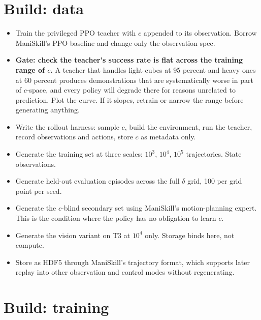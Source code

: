 \documentclass[9pt]{extarticle}
\newcommand{\ck}{\item[$\square$]}
\begin{document}
\section{Build: data}

\begin{itemize}
\ck Train the privileged PPO teacher with $c$ appended to its observation. Borrow ManiSkill's PPO baseline and change only the observation spec.
\ck \textbf{Gate: check the teacher's success rate is flat across the training range of $c$.} A teacher that handles light cubes at 95 percent and heavy ones at 60 percent produces demonstrations that are systematically worse in part of $c$-space, and every policy will degrade there for reasons unrelated to prediction. Plot the curve. If it slopes, retrain or narrow the range before generating anything.
\ck Write the rollout harness: sample $c$, build the environment, run the teacher, record observations and actions, store $c$ as metadata only.
\ck Generate the training set at three scales: $10^3$, $10^4$, $10^5$ trajectories. State observations.
\ck Generate held-out evaluation episodes across the full $\delta$ grid, 100 per grid point per seed.
\ck Generate the $c$-blind secondary set using ManiSkill's motion-planning expert. This is the condition where the policy has no obligation to learn $c$.
\ck Generate the vision variant on T3 at $10^4$ only. Storage binds here, not compute.
\ck Store as HDF5 through ManiSkill's trajectory format, which supports later replay into other observation and control modes without regenerating.
\end{itemize}

\section{Build: training}
\end{document}
